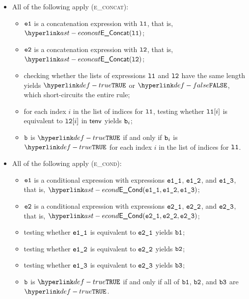 \begin{itemize}
  \item All of the following apply (\textsc{e\_concat}):
  \begin{itemize}
    \item $\texttt{e1}$ is a concatenation expression with $\texttt{l1}$, that is, $\EConcat(\vlone)$;
    \item $\texttt{e2}$ is a concatenation expression with $\texttt{l2}$, that is, $\EConcat(\vltwo)$;
    \item checking whether the lists of expressions $\texttt{l1}$ and $\texttt{l2}$ have the same length yields
          $\True$ or $\False$, which short-circuits the entire rule;
    \item for each index $i$ in the list of indices for $\texttt{l1}$, testing whether $\texttt{l1}[i]$ is equivalent to $\texttt{l2}[i]$
          in $\textsf{tenv}$ yields $\texttt{b}_i$\ProseOrTypeError;
    \item $\texttt{b}$ is $\True$ if and only if $\texttt{b}_i$ is $\True$ for each index $i$ in the list of indices for $\texttt{l1}$.
  \end{itemize}

  \item All of the following apply (\textsc{e\_cond}):
  \begin{itemize}
    \item $\texttt{e1}$ is a conditional expression with expressions $\texttt{e1\_1}$, $\texttt{e1\_2}$, and $\texttt{e1\_3}$,
          that is, $\ECond(\veoneone, \veonetwo, \veonethree)$;
    \item $\texttt{e2}$ is a conditional expression with expressions $\texttt{e2\_1}$, $\texttt{e2\_2}$, and $\texttt{e2\_3}$,
          that is, $\ECond(\vetwoone, \vetwotwo, \vetwothree)$;
    \item testing whether $\texttt{e1\_1}$ is equivalent to $\texttt{e2\_1}$ yields $\texttt{b1}$\ProseOrTypeError;
    \item testing whether $\texttt{e1\_2}$ is equivalent to $\texttt{e2\_2}$ yields $\texttt{b2}$\ProseOrTypeError;
    \item testing whether $\texttt{e1\_3}$ is equivalent to $\texttt{e2\_3}$ yields $\texttt{b3}$\ProseOrTypeError;
    \item $\texttt{b}$ is $\True$ if and only if all of $\texttt{b1}$, $\texttt{b2}$, and $\texttt{b3}$ are $\True$.
  \end{itemize}


\end{itemize}
